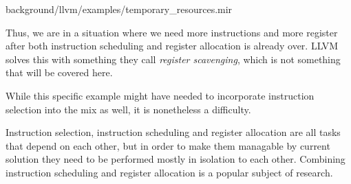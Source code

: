 
{background/llvm/examples/temporary_resources.mir}

Thus, we are in a situation where we need more instructions and more register after both
instruction scheduling and register allocation is already over. LLVM solves this with something
they call \textit{register scavenging}, which is not something that will be covered here.

While this specific example might have needed to incorporate instruction selection into
the mix as well, it is nonetheless a difficulty.

Instruction selection, instruction scheduling and register allocation are all tasks that
depend on each other, but in order to make them managable by current solution they need
to be performed mostly in isolation to each other. Combining instruction scheduling and
register allocation is a popular subject of research.
